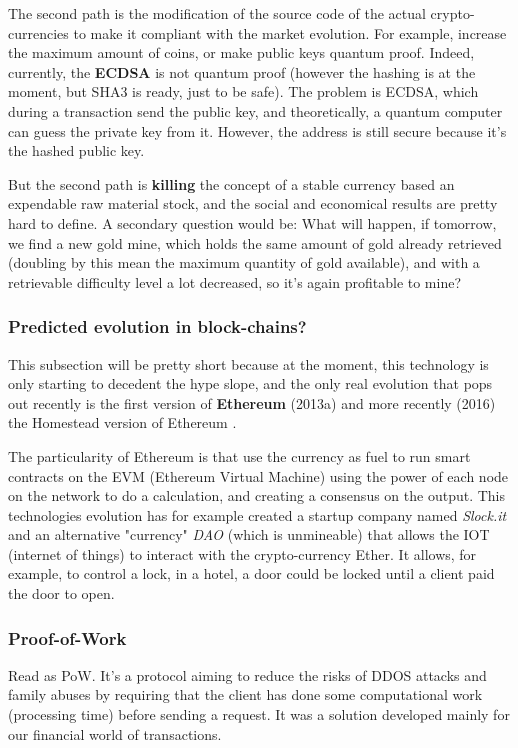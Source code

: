 The second path is the modification of the source code of the actual crypto-currencies to make it compliant with the market evolution. For example, increase the maximum amount of coins, or make public keys quantum proof. Indeed, currently, the \textbf{ECDSA} is not quantum proof (however the hashing is at the moment, but SHA3 is ready, just to be safe). The problem is ECDSA, which during a transaction send the public key, and theoretically, a quantum computer can guess the private key from it. However, the address is still secure because it's the hashed public key.

But the second path is \textbf{killing} the concept of a stable currency based an expendable raw material stock, and the social and economical results are pretty hard to define. A secondary question would be: What will happen, if tomorrow, we find a new gold mine, which holds the same amount of gold already retrieved (doubling by this mean the maximum quantity of gold available), and with a retrievable difficulty level a lot decreased, so it's again profitable to mine?

\subsubsection{Predicted evolution in block-chains?}
This subsection will be pretty short because at the moment, this technology is only starting to decedent the hype slope, and the only real evolution that pops out recently is the first version of  \textbf{Ethereum}\cite{VitalikButerin2013APlatform} (2013a) and more recently (2016) the Homestead version of Ethereum \cite{DR.GAVINWOOD2015ETHEREUM:DRAFT}.

The particularity of Ethereum is that use the currency as fuel to run smart contracts on the EVM (Ethereum Virtual Machine) using the power of each node on the network to do a calculation, and creating a consensus on the output. This technologies evolution has for example created a startup company named \textit{Slock.it} and an alternative "currency" \textit{DAO} (which is unmineable) that allows the IOT (internet of things) to interact with the crypto-currency Ether. It allows, for example, to control a lock, in a hotel, a door could be locked until a client paid the door to open.

\subsubsection{Proof-of-Work}
Read as PoW\cite{Dwork1993PricingMail}. It's a protocol aiming to reduce the risks of DDOS attacks and family abuses by requiring that the client has done some computational work (processing time) before sending a request. It was a solution developed mainly for our financial world of transactions.

